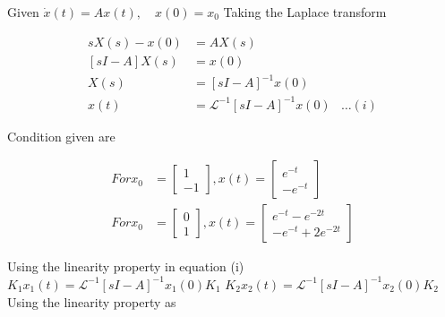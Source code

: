 \documentclass[11pt,a4paper]{article}
\begin{document}
\begin{tcolorbox}[solbox, title=Detailed Solution -- Question 96]
Given $\dot{x}(t)=A x(t), \quad x(0)=x_{0}$
 Taking the Laplace transform

\[
\begin{aligned} s X(s)-x(0) &=A X(s) \\ [s I-A] X(s) &=x(0) \\ X(s) &=[s I-A]^{-1} x(0) \\ x(t) &=\mathcal{L}^{-1}[s I-A]^{-1} x(0) &\ldots(i) \end{aligned}
\]

 Condition given are 

\[
\begin{aligned} For x_{0}&=\left[\begin{array}{c}1 \\ -1\end{array}\right], x(t)=\left[\begin{array}{c}e^{-t} \\ -e^{-t}\end{array}\right] \\ For x_{0}&=\left[\begin{array}{l}0 \\ 1\end{array}\right], x(t)=\left[\begin{array}{l}e^{-t}-e^{-2 t} \\ -e^{-t}+2 e^{-2 t}\end{array}\right] \end{aligned}
\]

Using the linearity property in equation (i) 
$K_{1} x_{1}(t)=\mathcal{L}^{-1}[s I-A]^{-1} x_{1}(0) K_{1}$
$K_{2} x_{2}(t)=\mathcal{L}^{-1}[s I-A]^{-1} x_{2}(0) K_{2}$
 Using the linearity property as 


\end{tcolorbox}
\end{document}
